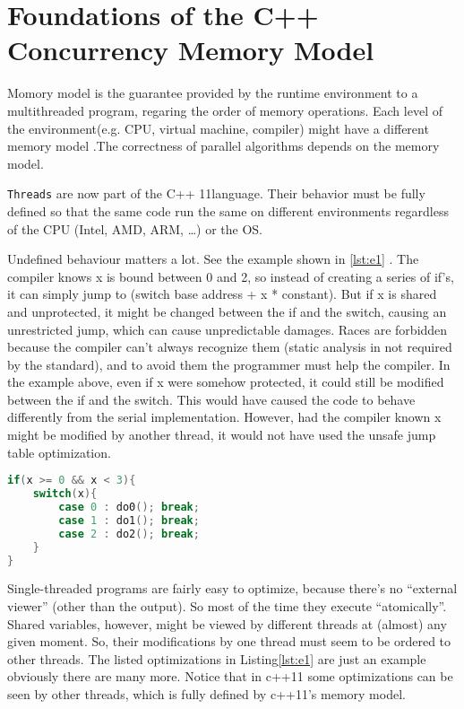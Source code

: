 \newpage
\section{Foundations of the C++ Concurrency Memory Model\cite{PPTTheC19:online,boehm2008foundations}}


Momory model is the guarantee provided by the runtime environment to a 
multithreaded program, regaring the order of memory operations. 
Each level of the environment(e.g. CPU, virtual machine, compiler) might have a different memory model
.The 
correctness of parallel algorithms depends on the memory model.


\texttt{Threads}  are now part of the C++ 11language.
Their behavior must be fully defined so that the same code
 run the same on different environments regardless of the CPU
  (Intel, AMD, ARM, …) or the OS.




Undefined behaviour matters a lot. See the example shown in \ref{lst:e1} . 
The compiler knows x is bound between 0 and 2, so instead of 
creating a series of if’s, it can simply jump to 
(switch base address + x * constant). 
But if x is shared and unprotected, it might be changed 
between the if and the switch, causing an unrestricted jump,
 which can cause unpredictable damages.
Races are forbidden because the compiler can’t always recognize them (static analysis in not required by the standard), 
and to avoid them the programmer must help the compiler.
In the example above, even if x were somehow protected, it could still be modified between the if and the switch. 
This would have caused the code to behave differently from the serial implementation. 
However, had the compiler known x might be modified by another thread, 
it would not have used the unsafe jump table optimization.


\begin{lstlisting}[language=C,frame=single, caption=An simple example  ,label = lst:e1]
if(x >= 0 && x < 3){
    switch(x){
        case 0 : do0(); break;
        case 1 : do1(); break;
        case 2 : do2(); break;
    }
}
\end{lstlisting}


Single-threaded programs are fairly easy to optimize, because there’s no “external viewer” (other than the output). 
So most of the time they execute “atomically”. Shared variables, however, might be viewed by different threads at 
(almost) any given moment. So, their modifications by one thread must seem to be ordered to other threads.
The listed optimizations in Listing\ref{lst:e1}  are just an example  obviously there are many more.
Notice that in c++11 some optimizations can be seen by other threads, which is fully defined by c++11’s memory model.


